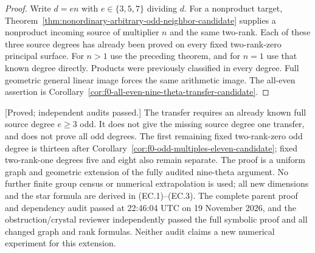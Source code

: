 \begin{proof}
Write $d=en$ with $e\in\{3,5,7\}$ dividing $d$. For a nonproduct
target, Theorem~\ref{thm:nonordinary-arbitrary-odd-neighbor-candidate}
supplies a nonproduct incoming source of multiplier $n$ and the
same two-rank. Each of these three source degrees has already
been proved on every fixed two-rank-zero principal surface.
For $n>1$ use the preceding theorem, and for $n=1$ use that known
degree directly. Products were previously classified in every
degree. Full geometric general linear image forces the same
arithmetic image. The all-even assertion is
Corollary~\ref{cor:f0-all-even-nine-theta-transfer-candidate}.
\end{proof}

\begin{remark}
\label{rem:cubic-component-norm-transfer-scope-candidate}
\textup{[Proved; independent audits passed.]}
The transfer requires an already known full source degree
$e\ge3$ odd. It does not give the missing source degree one
transfer, and does not prove all odd degrees. The first remaining
fixed two-rank-zero odd degree is thirteen after
Corollary~\ref{cor:f0-odd-multiples-eleven-candidate}; fixed two-rank-one
degrees five and eight also remain separate. The proof is a
uniform graph and geometric extension of the fully audited
nine-theta argument. No further finite group census or numerical
extrapolation is used; all new dimensions and the star formula
are derived in (EC.1)--(EC.3). The complete parent proof and dependency audit passed at
22:46:04 UTC on 19 November 2026, and the obstruction/crystal
reviewer independently passed the full symbolic proof and
all changed graph and rank formulas. Neither audit claims
a new numerical experiment for this extension.
\end{remark}

